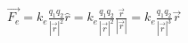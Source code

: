 \documentclass{article}
\begin{document}
$\vec{F_e} = k_e\frac{q_1q_2}{|\vec{r}|^2}\hat{r} = 
		k_e\frac{q_1q_2}{|\vec{r}|^2}\frac{\vec{r}}{|\vec{r}|}=
		k_e\frac{q_1q_2}{|\vec{r}|^3}\vec{r}$
\end{document}

